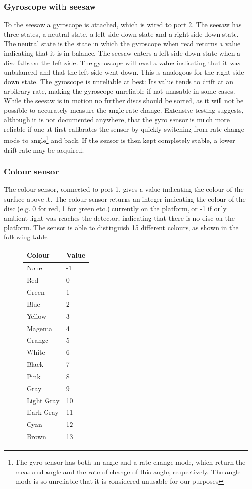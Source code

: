 \documentclass[a4paper,oneside,11pt]{article}
\begin{document}
\subsubsection{Gyroscope with seesaw}
To the seesaw a gyroscope is attached, which is wired to port 2. The seesaw has three states, a neutral state, a left-side down state and a right-side down state. The neutral state is the state in which the gyroscope when read returns a value indicating that it is in balance. The seesaw enters a left-side down state when a disc falls on the left side. The gyroscope will read a value indicating that it was unbalanced and that the left side went down.
This is analogous for the right side down state. The gyroscope is unreliable at best: Its value tends to drift at an arbitrary rate, making the gyroscope unreliable if not unusable in some cases. While the seesaw is in motion no further discs should be sorted, as it will not be possible to accurately measure the angle rate change. Extensive testing suggests, although it is not documented anywhere, that the gyro sensor is much more reliable if one at first calibrates the sensor by quickly switching from rate change mode to angle\footnote{The gyro sensor has both an angle and a rate change mode, which return the measured angle and the rate of change of this angle, respectively. The angle mode is so unreliable that it is considered unusable for our purposes} and back. If the sensor is then kept completely stable, a lower drift rate may be acquired.

\subsubsection{Colour sensor}
The colour sensor, connected to port 1, gives a value indicating the colour of the surface above it. The colour sensor returns an integer indicating the colour of the disc (e.g. 0 for red, 1 for green etc.) currently on the platform, or -1 if only ambient light was reaches the detector, indicating that there is no disc on the platform. The sensor is able to distinguish 15 different colours, as shown in the following table:

\begin{figure}[H]
\begin{tabular}{|l|l|}
\hline
\textbf{Colour} & \textbf{Value} \\
\hline
None & -1 \\
Red & 0 \\
Green & 1 \\
Blue & 2 \\
Yellow & 3 \\
Magenta & 4 \\
Orange & 5 \\
White & 6 \\
Black & 7 \\
Pink & 8 \\
Gray & 9 \\
Light Gray & 10 \\
Dark Gray & 11 \\
Cyan & 12 \\
Brown & 13 \\
\hline
\end{tabular}
\end{figure}
\end{document}
